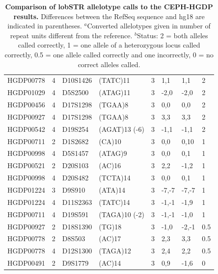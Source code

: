 \begin{table}[h!]
\begin{adjustbox}{width=1\textwidth,height=0.5\textwidth}
\begin{tabular}{l l l l l l l l  }
HGDP00778 & 4 & D10S1426 & (TATC)11 & 3 & 1,1   & 1,1   & 2   \\
HGDP01029 & 4 & D5S2500  & (ATAG)11 & 3 & -2,0  & -2,0  & 2   \\
HGDP00456 & 4 & D17S1298 & (TGAA)8  & 3 & 0,0   & 0,0   & 2   \\
HGDP00927 & 4 & D17S1298 & (TGAA)8  & 3 & 3,3   & 3,3   & 2   \\
HGDP00542 & 4 & D19S254  & (AGAT)13 (-6) & 3 & -1,1  & -1,1  & 2   \\
HGDP00711 & 2 & D1S2682  & (CA)10   & 3 & 0,0   & 0,10  & 1   \\
HGDP00998 & 4 & D5S1457  & (ATAG)9  & 3 & 0,0   & 0,1   & 1   \\
HGDP00521 & 2 & D20S103  & (AC)16   & 3 & 2,2   & -1,2  & 1   \\
HGDP00998 & 4 & D20S482  & (TCTA)14 & 3 & 0,0   & 0,1   & 1   \\
HGDP01224 & 3 & D9S910   & (ATA)14  & 3 & -7,-7 & -7,-7 & 1   \\
HGDP01224 & 4 & D11S2363 & (TATC)14 & 3 & -1,-1 & -1,9  & 1   \\
HGDP00711 & 4 & D19S591  & (TAGA)10 (-2) & 3 & -1,-1 & -1,0  & 1   \\
HGDP00927 & 2 & D18S1390 & (TG)18   & 3 & -1,0  & -2,-1 & 0.5 \\
HGDP00778 & 2 & D8S503   & (AC)17   & 3 & 2,3   & 3,3   & 0.5 \\
HGDP00778 & 4 & D12S1300 & (TAGA)12 & 3 & 2,4   & 2,2   & 0.5 \\
HGDP00491 & 2 & D9S1779  & (AC)14   & 3 & 0,9   & -1,6  & 0  \\
\hline
\end{tabular}
\end{adjustbox}
\caption{\textbf{Comparison of lobSTR allelotype calls to the CEPH-HGDP results.} Differences between the RefSeq sequence and hg18 are indicated in parentheses. $^a$Converted allelotypes given in number of repeat units different from the reference. $^b$Status: 2 = both alleles called correctly, 1 = one allele of a heterozygous locus called correctly, 0.5 = one allele called correctly and one incorrectly, 0 = no correct alleles called.}
\end{table}

\pagebreak

